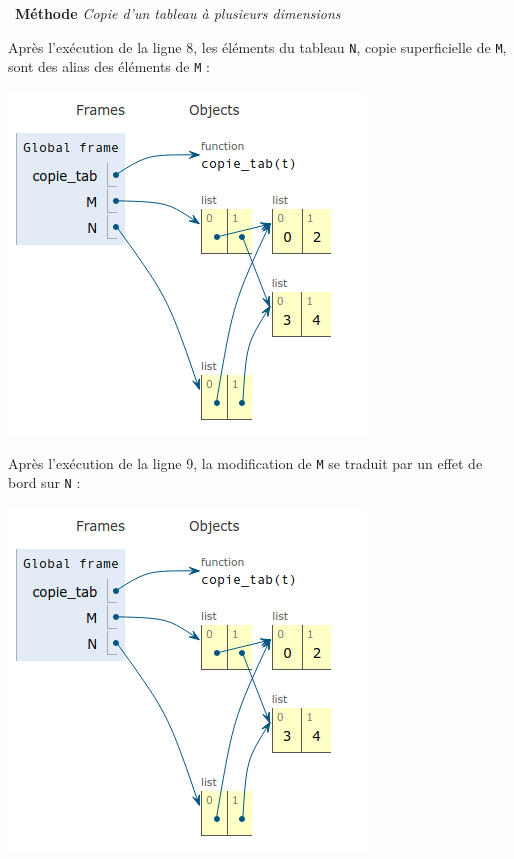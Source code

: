 \documentclass[a4paper, french, 12pt]{article}
\newenvironment{methode}[1]
{\par \medskip    \noindent  
 \begin {bclogo}[arrondi =0.1,logo=\bcoutil, marge=4,noborder = true] {~\textbf{Méthode}   {\itshape #1} }  \par}
{
\end{bclogo}
 \par \bigskip }
\begin{document}
\begin{methode}{Copie d'un tableau à plusieurs dimensions}
\begin{minipage}[t]{0.45\linewidth}
Après l'exécution de la ligne 8, les éléments du tableau \texttt{N}, copie superficielle de \texttt{M}, sont des alias des éléments de \texttt{M} :
\begin{center}
\includegraphics[scale=0.6]{images/copie_tab2.png}
\end{center}
\end{minipage}
\hfill
\begin{minipage}[t]{0.45\linewidth}
Après l'exécution de la ligne 9, la modification de \texttt{M} se traduit par un effet de bord sur \texttt{N} :
\begin{center}
\includegraphics[scale=0.6]{images/copie_tab2.png}
\end{center}
\end{minipage}







\end{methode}
\end{document}
